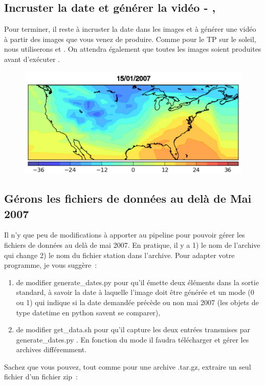 \subsection{Incruster la date et générer la vidéo  - \imagemagick, \ffmpeg}

Pour terminer, il reste à incruster la date dans les images et à générer une vidéo à partir des images que vous venez de produire. Comme pour le TP sur le soleil, nous utiliserons \imagemagick et \ffmpeg. On attendra également que toutes les images soient produites avant d'exécuter \ffmpeg.

\begin{figure}[htbp]
\includegraphics[width=0.7\linewidth]{Figs/meteo_date.png}
\end{figure}

\subsection{Gérons les fichiers de données au delà de Mai 2007}

Il n'y que peu de modifications à apporter au pipeline pour pouvoir gérer les fichiers de données au delà de mai 2007. En pratique, il y a 1) le nom de l'archive qui change 2) le nom du fichier station dans l'archive. Pour adapter votre programme, je vous suggère~:
\begin{enumerate}
\item de modifier generate\_dates.py pour qu'il émette deux éléments dans la sortie standard, à savoir la date à laquelle l'image doit être générée et un mode (0 ou 1) qui indique si la date demandée précède ou non mai 2007 (les objets de type datetime en python savent se comparer),
\item de modifier get\_data.sh pour qu'il capture les deux entrées transmises par generate\_dates.py . En fonction du mode il faudra télécharger et gérer les archives différemment.
\end{enumerate}

Sachez que vous pouvez, tout comme pour une archive .tar.gz, extraire un seul fichier d'un fichier zip~:

